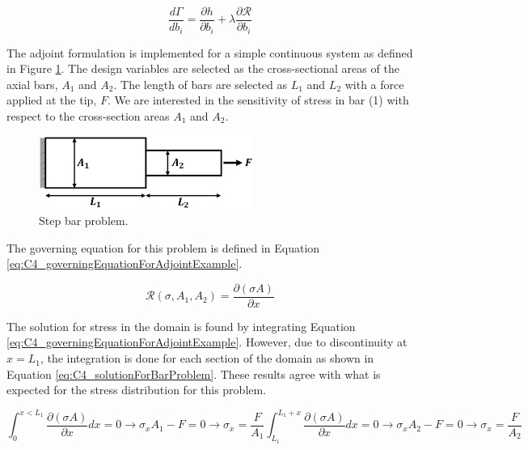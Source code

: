 \begin{equation}\label{eq:C4_functionSensitivityAdjoint}
	\frac{d \Gamma}{d b_i} = 
	\frac{\partial h}{\partial b_i} + 
	\lambda \frac{\partial \mathcal{R}}{\partial b_i}
\end{equation}

The adjoint formulation is implemented for a simple continuous system as defined in Figure \ref{fig:C4_stepBeamAdjoint}. The design variables are selected as the cross-sectional areas of the axial bars, $A_1$ and $A_2$. The length of bars are selected as $L_1$ and $L_2$ with a force applied at the tip, $F$. We are interested in the sensitivity of stress in bar (1) with respect to the cross-section areas $A_1$ and $A_2$.

\begin{figure}[H]
	\centering
	\includegraphics[width=7.00cm]{Chapter_4/figure/beam_adjoint_example_problem.png}
	\caption{Step bar problem.}
	\label{fig:C4_stepBeamAdjoint}
\end{figure}

The governing equation for this problem is defined in Equation \eqref{eq:C4_governingEquationForAdjointExample}.

\begin{equation}\label{eq:C4_governingEquationForAdjointExample}
	\mathcal{R}(\sigma, A_1, A_2) = \frac{\partial (\sigma A)}{\partial x}
\end{equation}

The solution for stress in the domain is found by integrating Equation \eqref{eq:C4_governingEquationForAdjointExample}. However, due to discontinuity at $x = L_1$, the integration is done for each section of the domain as shown in Equation \eqref{eq:C4_solutionForBarProblem}. These results agree with what is expected for the stress distribution for this problem.

\begin{subequations}\label{eq:C4_solutionForBarProblem}
\begin{equation}
	\int_0^{x < L_1} \frac{\partial (\sigma A)}{\partial x} dx = 0 \rightarrow \sigma_x A_1 - F = 0 \rightarrow \sigma_x = \frac{F}{A_1}
\end{equation}
\begin{equation}
	\int_{L_1}^{L_1 + x} \frac{\partial (\sigma A)}{\partial x} dx = 0 \rightarrow \sigma_x A_2 - F = 0 \rightarrow \sigma_x = \frac{F}{A_2}
\end{equation}
\end{subequations}


